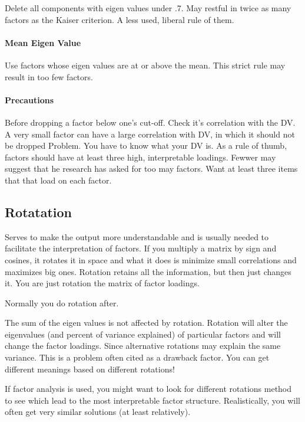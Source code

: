 \documentclass[]{book}
\let\oldparagraph\paragraph
\renewcommand{\paragraph}[1]{\oldparagraph{#1}\mbox{}}
\theoremstyle{definition}
\theoremstyle{definition}
\theoremstyle{definition}
\theoremstyle{remark}
\begin{document}
Delete all components with eigen values under .7. May restful in twice
as many factors as the Kaiser criterion. A less used, liberal rule of
them.

\paragraph{Mean Eigen Value}\label{mean-eigen-value}

Use factors whose eigen values are at or above the mean. This strict
rule may result in too few factors.

\paragraph{Precautions}\label{precautions}

Before dropping a factor below one's cut-off. Check it's correlation
with the DV. A very small factor can have a large correlation with DV,
in which it should not be dropped Problem. You have to know what your DV
is. As a rule of thumb, factors should have at least three high,
interpretable loadings. Fewwer may suggest that he research has asked
for too may factors. Want at least three items that that load on each
factor.

\subsection{Rotatation}\label{rotatation}

Serves to make the output more understandable and is usually needed to
facilitate the interpretation of factors. If you multiply a matrix by
sign and cosines, it rotates it in space and what it does is minimize
small correlations and maximizes big ones. Rotation retains all the
information, but then just changes it. You are just rotation the matrix
of factor loadings.

Normally you do rotation after.

The sum of the eigen values is not affected by rotation. Rotation will
alter the eigenvalues (and percent of variance explained) of particular
factors and will change the factor loadings. Since alternative rotations
may explain the same variance. This is a problem often cited as a
drawback factor. You can get different meanings based on different
rotations!

If factor analysis is used, you might want to look for different
rotations method to see which lead to the most interpretable factor
structure. Realistically, you will often get very similar solutions (at
least relatively).
\end{document}
